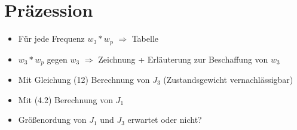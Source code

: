 

\section{Präzession}

\begin{itemize}
    \item Für jede Frequenz $w_3 * w_p$ $\Rightarrow$ Tabelle
    \item $w_3 * w_p$ gegen $w_3$ $\Rightarrow$ Zeichnung + Erläuterung zur Beschaffung von $w_3$
    \item Mit Gleichung (12) Berechnung von $J_3$ (Zustandsgewicht vernachlässigbar)
    \item Mit (4.2) Berechnung von $J_1$
    \item Größenordung von $J_1$ und $J_3$ erwartet oder nicht?
\end{itemize}